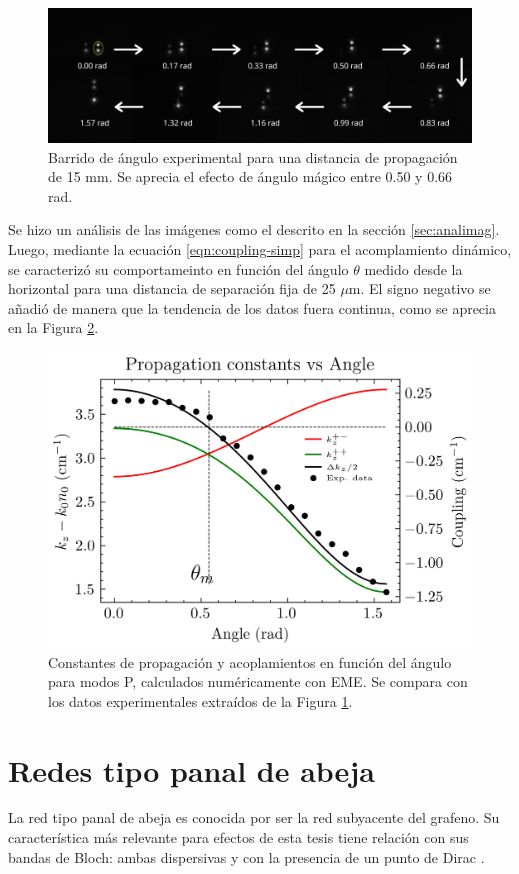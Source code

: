 \begin{figure}[H]
	\centering
	\includegraphics[trim={0 2cm 0 4cm},clip, width=\linewidth]{media/26um_15mm_angles_v2.png}
	\caption[Barrido de ángulo experimental.]{Barrido de ángulo experimental para una distancia de propagación de 15 mm. Se aprecia el efecto de ángulo mágico entre 0.50 y 0.66 rad. \label{fig:angulobarrido}}
\end{figure}
Se hizo un análisis de las imágenes como el descrito en la sección \ref{sec:analimag}. Luego, mediante la ecuación \ref{eqn:coupling-simp} para el acomplamiento dinámico, se caracterizó su comportameinto en función del ángulo $\theta$ medido desde la horizontal para una distancia de separación fija de 25 $\mu$m. El signo negativo se añadió de manera que la tendencia de los datos fuera continua, como se aprecia en la Figura \ref{fig:invisibility-coup}. 
\begin{figure}[H]
	\centering
	\includegraphics[width=0.8\linewidth]{codigo/eigenvalues_vs_angle.png}
	\caption[Constantes de propagación y acoplamientos en función del 
	ángulo para modos P.]{Constantes de propagación y acoplamientos en función del 
	ángulo para modos P, calculados numéricamente con EME. Se compara con los datos experimentales extraídos de la Figura \ref{fig:angulobarrido}. \label{fig:invisibility-coup}}
\end{figure}
\section{Redes tipo panal de abeja}
La red tipo panal de abeja es conocida por ser la red subyacente del grafeno. Su característica más relevante para efectos de esta tesis tiene relación con sus bandas de Bloch: ambas dispersivas y con la presencia de un punto de Dirac  \citep{honeycombdirac}.

